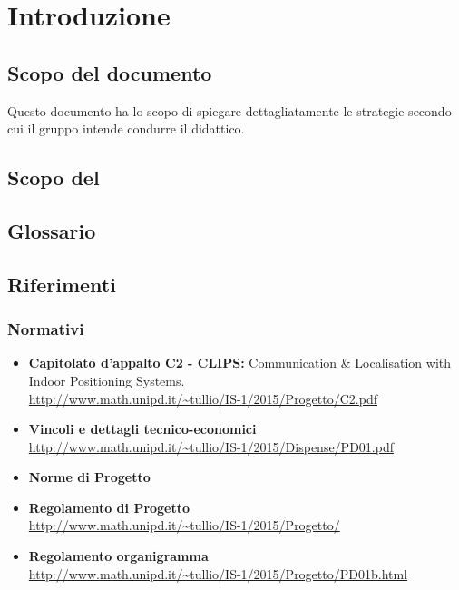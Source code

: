 \section{Introduzione}
	\subsection{Scopo del documento} 
	Questo documento ha lo scopo di spiegare dettagliatamente le strategie secondo cui il gruppo \AUTORE{} intende condurre il  didattico. 
	\subsection{Scopo del }
	\SCOPO
	\subsection{Glossario}
	\GLOSSARIO
	\subsection{Riferimenti}
		\subsubsection{Normativi}
			\begin{itemize}
				\item \textbf{Capitolato d'appalto C2 - CLIPS:} Communication \& Localisation with Indoor Positioning Systems. \\
				\url{http://www.math.unipd.it/~tullio/IS-1/2015/Progetto/C2.pdf}
				\item \textbf{Vincoli e dettagli tecnico-economici} \\
				\url{http://www.math.unipd.it/~tullio/IS-1/2015/Dispense/PD01.pdf}
				\item \textbf{Norme di Progetto} \\ \NPdoc
				\item \textbf{Regolamento di Progetto} \\
				\url{http://www.math.unipd.it/~tullio/IS-1/2015/Progetto/}
				\item \textbf{Regolamento organigramma} \\
				\url{http://www.math.unipd.it/~tullio/IS-1/2015/Progetto/PD01b.html}
			\end{itemize}	
			
